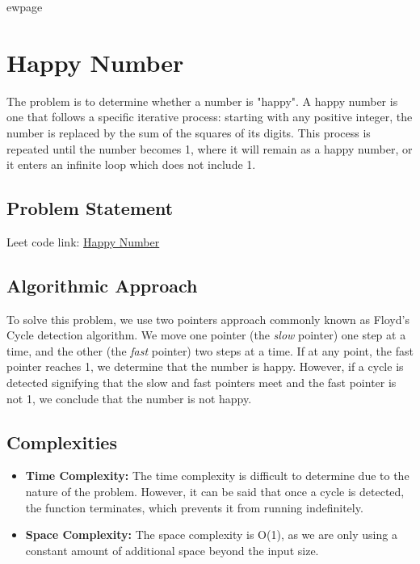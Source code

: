 
ewpage
\chapter{Happy Number}
\label{chap:happy_number}

The problem is to determine whether a number is "happy". A happy number is one that follows a specific iterative process: starting with any positive integer, the number is replaced by the sum of the squares of its digits. This process is repeated until the number becomes 1, where it will remain as a happy number, or it enters an infinite loop which does not include 1.

\section*{Problem Statement}

Leet code link: \href{https://leetcode.com/problems/happy-number/}{Happy Number}

\section*{Algorithmic Approach}

To solve this problem, we use two pointers approach commonly known as Floyd's Cycle detection algorithm. We move one pointer (the \textit{slow} pointer) one step at a time, and the other (the \textit{fast} pointer) two steps at a time. If at any point, the fast pointer reaches 1, we determine that the number is happy. However, if a cycle is detected signifying that the slow and fast pointers meet and the fast pointer is not 1, we conclude that the number is not happy.

\section*{Complexities}

\begin{itemize}
	\item \textbf{Time Complexity:} The time complexity is difficult to determine due to the nature of the problem. However, it can be said that once a cycle is detected, the function terminates, which prevents it from running indefinitely.
	\item \textbf{Space Complexity:} The space complexity is O(1), as we are only using a constant amount of additional space beyond the input size.
\end{itemize}


